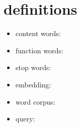 \chapter{definitions}

\begin{itemize}
    \item content words:
    \item function words:
    \item stop words:
    \item embedding:
    \item word corpus:
    \item query:
\end{itemize}